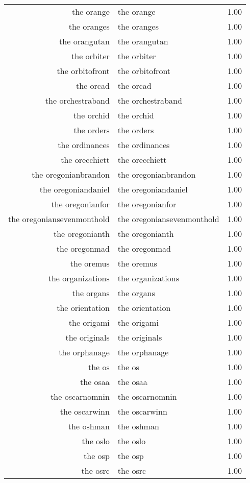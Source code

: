 \begin{table}[ht]
\begin{tabular}{rlr}
  the orange & the orange & 1.00 \\ 
  the oranges & the oranges & 1.00 \\ 
  the orangutan & the orangutan & 1.00 \\ 
  the orbiter & the orbiter & 1.00 \\ 
  the orbitofront & the orbitofront & 1.00 \\ 
  the orcad & the orcad & 1.00 \\ 
  the orchestraband & the orchestraband & 1.00 \\ 
  the orchid & the orchid & 1.00 \\ 
  the orders & the orders & 1.00 \\ 
  the ordinances & the ordinances & 1.00 \\ 
  the orecchiett & the orecchiett & 1.00 \\ 
  the oregonianbrandon & the oregonianbrandon & 1.00 \\ 
  the oregoniandaniel & the oregoniandaniel & 1.00 \\ 
  the oregonianfor & the oregonianfor & 1.00 \\ 
  the oregoniansevenmonthold & the oregoniansevenmonthold & 1.00 \\ 
  the oregonianth & the oregonianth & 1.00 \\ 
  the oregonmad & the oregonmad & 1.00 \\ 
  the oremus & the oremus & 1.00 \\ 
  the organizations & the organizations & 1.00 \\ 
  the organs & the organs & 1.00 \\ 
  the orientation & the orientation & 1.00 \\ 
  the origami & the origami & 1.00 \\ 
  the originals & the originals & 1.00 \\ 
  the orphanage & the orphanage & 1.00 \\ 
  the os & the os & 1.00 \\ 
  the osaa & the osaa & 1.00 \\ 
  the oscarnomnin & the oscarnomnin & 1.00 \\ 
  the oscarwinn & the oscarwinn & 1.00 \\ 
  the oshman & the oshman & 1.00 \\ 
  the oslo & the oslo & 1.00 \\ 
  the osp & the osp & 1.00 \\ 
  the osrc & the osrc & 1.00 \\ 

\end{tabular}
\end{table}
